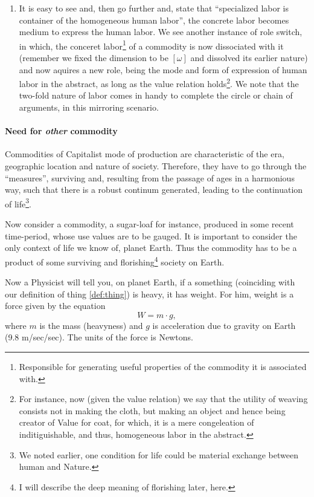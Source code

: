 \documentclass[12pt]{extarticle}
\theoremstyle{definition}
\newenvironment{remark}[1][Remark]{\begin{trivlist}
\item[\hskip \labelsep {\bfseries #1}]}{\end{trivlist}}
\begin{document}
\begin{remark}
\begin{enumerate}
     \item It is easy to see and, then go further and, state that ``specialized labor is container of the homogeneous human labor'', the concrete labor becomes medium to express the human labor.  We see another instance of role switch, in which, the conceret labor\footnote{Responsible for generating useful properties of the commodity it is associated with.} of a commodity is now dissociated with it (remember we fixed the dimension to be $[\omega]$ and dissolved its earlier nature) and now aquires a new role, being the mode and form of expression of human labor in the abstract, as long as the value relation holds\footnote{For instance, now (given the value relation)  we say that the utility of weaving consists not in making the cloth, but making an object and hence being creator of Value for coat, for which, it is a mere congeleation of inditiguishable, and thus, homogeneous labor in the abstract.}.  We note that the two-fold nature of labor comes in handy to complete the circle or chain of arguments, in this mirroring scenario.
   \end{enumerate}
 \end{remark}

 \paragraph{Need for \emph{other} commodity}
 \label{par:needforother}
 Commodities of Capitalist mode of production are characteristic of the era, geographic location and nature of society.  Therefore, they have to go through the ``measures'', surviving and, resulting from the passage of ages in a harmonious way, such that there is a robust continum generated, leading to the continuation of life\footnote{We noted earlier, one condition for life could be material exchange between human and Nature.}.

 Now consider a commodity, a sugar-loaf for instance, produced in some recent time-period, whose use values are to be gauged.  It is important to consider the only context of life we know of, planet Earth.  Thus the commodity has to be a product of some surviving and florishing\footnote{I will describe the deep meaning of florishing later, here.} society on Earth.

 Now a Physicist will tell you, on planet Earth, if a something (coinciding with our definition of thing \ref{def:thing}) is heavy, it has weight.  For him, weight is a force given by the equation
 \begin{equation}
   \label{eq:weightphysics}
   W = m\cdot g,
 \end{equation}
 where $m$ is the mass (heavyness) and $g$ is acceleration due to gravity on Earth (9.8 m/sec/sec).  The units of the force is Newtons.
\end{document}
